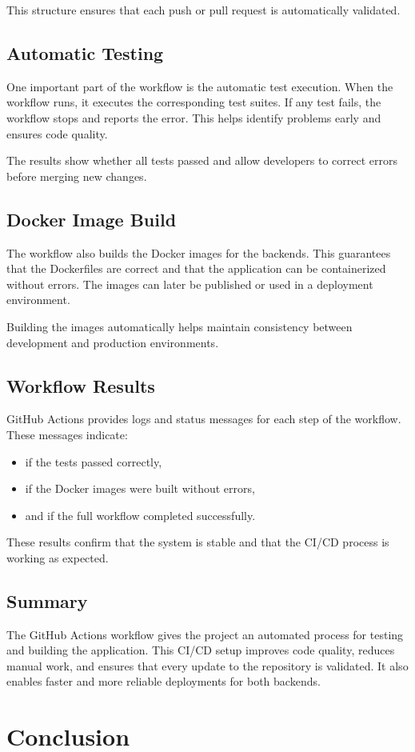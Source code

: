 \documentclass[12pt,a4paper]{article}
\begin{document}
This structure ensures that each push or pull request is automatically validated.

\subsection{Automatic Testing}

One important part of the workflow is the automatic test execution. When the workflow runs, it executes the corresponding test suites. If any test fails, the workflow stops and reports the error. This helps identify problems early and ensures code quality.

The results show whether all tests passed and allow developers to correct errors before merging new changes.

\subsection{Docker Image Build}

The workflow also builds the Docker images for the backends. This guarantees that the Dockerfiles are correct and that the application can be containerized without errors. The images can later be published or used in a deployment environment.

Building the images automatically helps maintain consistency between development and production environments.

\subsection{Workflow Results}

GitHub Actions provides logs and status messages for each step of the workflow. These messages indicate:

\begin{itemize}
	\item if the tests passed correctly,
	\item if the Docker images were built without errors,
	\item and if the full workflow completed successfully.
\end{itemize}

These results confirm that the system is stable and that the CI/CD process is working as expected.

\subsection{Summary}

The GitHub Actions workflow gives the project an automated process for testing and building the application. This CI/CD setup improves code quality, reduces manual work, and ensures that every update to the repository is validated. It also enables faster and more reliable deployments for both backends.


\section{Conclusion}
\end{document}
